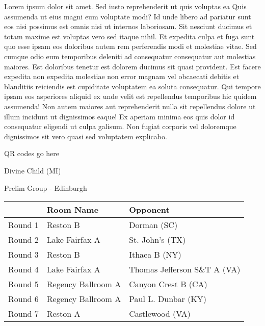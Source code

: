 \documentclass{article}%
\begin{document}
\vspace*{8pt}%
\linebreak%
\newline%
\newline%
Lorem ipsum dolor sit amet. Sed iusto reprehenderit ut quis voluptas ea Quis assumenda ut eius magni eum voluptate modi? Id unde libero ad pariatur sunt eos nisi possimus est omnis nisi ut internos laboriosam. Sit nesciunt ducimus et totam maxime est voluptas vero sed itaque nihil. Et expedita culpa et fuga sunt quo esse ipsam eos doloribus autem rem perferendis modi et molestiae vitae.\newline%
\newline%
Sed cumque odio eum temporibus deleniti ad consequatur consequatur aut molestias maiores. Est doloribus tenetur est dolorem ducimus sit quasi provident. Est facere expedita non expedita molestiae non error magnam vel obcaecati debitis et blanditiis reiciendis est cupiditate voluptatem ea soluta consequatur. Qui tempore ipsam eos asperiores aliquid ex unde velit est repellendus temporibus hic quidem assumenda!\newline%
\newline%
Non autem maiores aut reprehenderit nulla sit repellendus dolore ut illum incidunt ut dignissimos eaque! Ex aperiam minima eos quis dolor id consequatur eligendi ut culpa galisum. Non fugiat corporis vel doloremque dignissimos sit vero quasi sed voluptatem explicabo.\newline%
\newline%
%
\vspace*{30pt}%
\begin{center}%
\begin{Huge}%
QR codes go here%
\end{Huge}%
\end{center}%
\newpage%
%
\begin{center}%
\begin{Huge}%
Divine Child (MI)%
\end{Huge}%
\vspace*{8pt}%
\linebreak%
\begin{Large}%
Prelim Group {-} Edinburgh%
\end{Large}%
\end{center}%
\begin{tabularx}{\textwidth}{|c|Y|Y|}%
\hline%
&Room Name&Opponent\\%
\hline%
Round 1&Reston B&Dorman (SC)\\%
Round 2&Lake Fairfax A&St. John's (TX)\\%
Round 3&Reston B&Ithaca B (NY)\\%
Round 4&Lake Fairfax A&Thomas Jefferson S\&T A (VA)\\%
Round 5&Regency Ballroom A&Canyon Crest B (CA)\\%
Round 6&Regency Ballroom A&Paul L. Dunbar (KY)\\%
Round 7&Reston A&Castlewood (VA)\\%
\hline%
\end{tabularx}%
\end{document}
